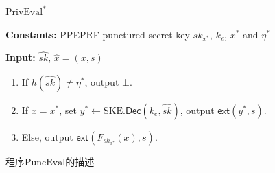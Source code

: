 \begin{figure}[!hbth]
\begin{framed}
\begin{minipage}[center]{\textwidth}
\begin{center}
    $\text{PrivEval}^*$ 
\end{center}
\vspace{-1em}
\begin{trivlist}
    \item \textbf{Constants:} PPEPRF punctured secret key $sk_{x^*}$, $k_e$, $x^*$ and $\eta^*$
    
    \item \textbf{Input:} $\hat{sk}$, $\hat{x} = (x, s)$ 
        \begin{enumerate}\itemsep 1pt \parskip 0pt \parsep 0pt
            \item If $h(\hat{sk}) \neq \eta^*$, output $\bot$. 
            \item If $x = x^*$, set $y^* \leftarrow \text{SKE}.\mathsf{Dec}(k_e, \hat{sk})$, 
                output $\mathsf{ext}(y^*, s)$. 
            \item Else, output $\mathsf{ext}(F_{sk_{x^*}}(x), s)$. 
        \end{enumerate}
\end{trivlist}
\end{minipage}
\end{framed}
\caption{程序$\text{PuncEval}$的描述}
\label{fig:improved-PPEPRF-PrivEval-star}
\end{figure}

